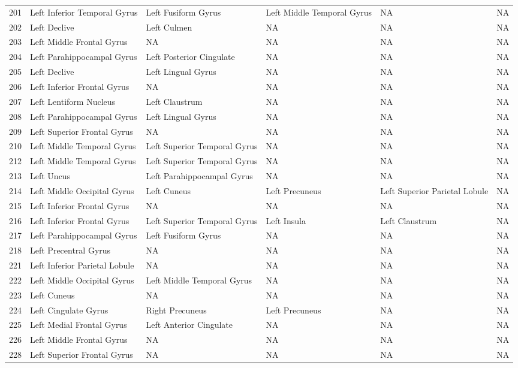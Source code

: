 \documentclass[10pt,letterpaper]{article}\usepackage[]{graphicx}\usepackage[]{color}
\begin{document}
\begin{center}
\begin{longtable}[c]{cP{1.1in}P{1.1in}P{1.1in}P{1.1in}P{1.1in}}
		201	& Left Inferior Temporal Gyrus & Left Fusiform Gyrus & Left Middle Temporal Gyrus & NA & NA \\
		202	& Left Declive & Left Culmen & NA & NA & NA \\
		203	& Left Middle Frontal Gyrus & NA & NA & NA & NA \\
		204	& Left Parahippocampal Gyrus & Left Posterior Cingulate	& NA & NA & NA \\
		205	& Left Declive & Left Lingual Gyrus & NA & NA & NA \\
		206	& Left Inferior Frontal Gyrus & NA & NA & NA & NA \\
		207	& Left Lentiform Nucleus & Left Claustrum & NA & NA	& NA \\
		208	& Left Parahippocampal Gyrus & Left Lingual Gyrus & NA & NA	& NA \\
		209	& Left Superior Frontal Gyrus & NA & NA	& NA & NA \\
		210	& Left Middle Temporal Gyrus & Left Superior Temporal Gyrus	& NA & NA & NA \\
		212	& Left Middle Temporal Gyrus & Left Superior Temporal Gyrus	& NA & NA & NA \\
		213	& Left Uncus & Left Parahippocampal Gyrus & NA & NA	& NA \\
		214	& Left Middle Occipital Gyrus & Left Cuneus & Left Precuneus & Left Superior Parietal Lobule & NA \\
		215	& Left Inferior Frontal Gyrus & NA & NA	& NA & NA \\
		216	& Left Inferior Frontal Gyrus & Left Superior Temporal Gyrus & Left Insula & Left Claustrum	& NA \\
		217	& Left Parahippocampal Gyrus & Left Fusiform Gyrus & NA	& NA & NA \\
		218	& Left Precentral Gyrus	& NA & NA & NA & NA \\
		221	& Left Inferior Parietal Lobule	& NA & NA & NA & NA \\
		222	& Left Middle Occipital Gyrus & Left Middle Temporal Gyrus & NA	& NA & NA \\
		223	& Left Cuneus & NA & NA	& NA & NA \\
		224	& Left Cingulate Gyrus & Right Precuneus & Left Precuneus & NA & NA \\
		225	& Left Medial Frontal Gyrus & Left Anterior Cingulate & NA & NA	& NA \\
		226	& Left Middle Frontal Gyrus & NA & NA & NA & NA \\
		228	& Left Superior Frontal Gyrus & NA & NA	& NA & NA \\

\end{longtable}
\end{center}
\end{document}
